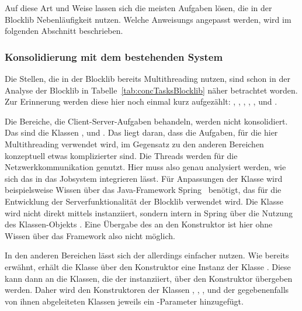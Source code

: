 Auf diese Art und Weise lassen sich die meisten Aufgaben lösen, die in der Blocklib Nebenläufigkeit nutzen. Welche \glspl{Anweisung} angepasst werden, wird im folgenden Abschnitt beschrieben.

\subsubsection{Konsolidierung mit dem bestehenden System}\label{sec:Konsolidierung}

Die Stellen, die in der Blocklib bereits Multithreading nutzen, sind schon in der Analyse der Blocklib in Tabelle~\ref{tab:concTasksBlocklib} näher betrachtet worden. Zur Erinnerung werden diese hier noch einmal kurz aufgezählt: , , , , ,  und .

Die Bereiche, die Client-Server-Aufgaben behandeln, werden nicht konsolidiert. Das sind die Klassen ,  und . Das liegt daran, dass die Aufgaben, für die hier Multithreading verwendet wird, im Gegensatz zu den anderen Bereichen konzeptuell etwas komplizierter sind. Die Threads werden für die Netzwerkkommunikation genutzt. Hier muss also genau analysiert werden, wie sich das in das Jobsystem integrieren lässt. Für Anpassungen der Klasse  wird beispielsweise Wissen über das Java-Framework Spring~\cite{VMware2022} benötigt, das für die Entwicklung der Serverfunktionalität der Blocklib verwendet wird. Die Klasse wird nicht direkt mittels  instanziiert, sondern intern in Spring über die Nutzung des Klassen-Objekts . Eine Übergabe des  an den Konstruktor ist hier ohne Wissen über das Framework also nicht möglich.

In den anderen Bereichen lässt sich der  allerdings einfacher nutzen. Wie bereits erwähnt, erhält die Klasse  über den Konstruktor eine Instanz der Klasse . Diese kann dann an die Klassen, die der  instanziiert, über den Konstruktor übergeben werden. Daher wird den Konstruktoren der Klassen , , ,  und der gegebenenfalls von ihnen abgeleiteten Klassen jeweils ein -Parameter hinzugefügt.

